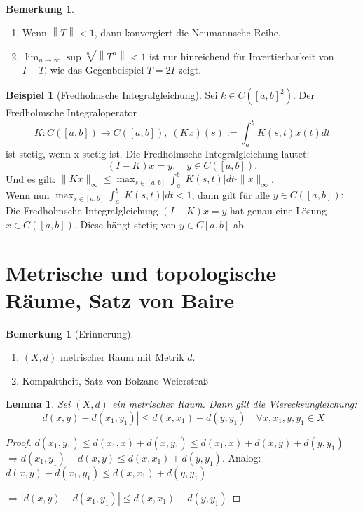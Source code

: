 \documentclass[ngerman]{report}
\theoremstyle{plain}%
\newtheorem{lemma}[thm]{Lemma}
\theoremstyle{definition}%
\newtheorem{bsp}[thm]{Beispiel}
\theoremstyle{myStyle}
\newtheorem{bem}[thm]{Bemerkung}
\newcommand{\norm}[1]{\left \|#1\right\| }
\newcommand{\df}[1][]{%
	\overset{#1}{\Rightarrow}
}
\newcommand{\limes}[1][\infty]{\lim_{n \to #1}}
\newcommand{\disp}{\displaystyle}
\begin{document}
	\begin{bem}
		\begin{enumerate}
			\item Wenn $\norm{T} < 1$, dann konvergiert die Neumannsche Reihe.
			\item $\disp \limes\sup\sqrt[n]{\norm{T^n}} <1$ ist nur hinreichend für Invertierbarkeit von $I-T$, wie das Gegenbeispiel $T = 2I$ zeigt.
		\end{enumerate}
	\end{bem}
	\begin{bsp}[Fredholmsche Integralgleichung]
		Sei $k\in C([a,b]^2)$.
		Der Fredholmsche Integraloperator $$K:C([a,b])\to C([a,b]),\; (Kx)(s):=\int^b_a K(s,t)x(t)dt$$ ist stetig, wenn x stetig ist.
		Die Fredholmsche Integralgleichung lautet: $$(I-K)x=y,\quad y\in C([a,b]).$$
		Und es gilt: $\displaystyle \|Kx\|_\infty \leq \max_{s\in[a,b]} \int^b_a |K(s,t)|dt\cdot\|x\|_\infty$.\\
		Wenn nun $\displaystyle \max_{s\in[a,b]} \int^b_a |K(s,t)|dt<1$, dann gilt für alle $ y\in C([a,b]):$
		Die Fredholmsche Integralgleichung $(I-K)x=y$ hat genau eine Lösung $x\in C([a,b])$. Diese hängt stetig von $y\in C[a,b]$ ab.
	\end{bsp}

\section{Metrische und topologische Räume, Satz von Baire}
	\begin{bem}[Erinnerung]
		\begin{enumerate}[-]
			\item $(X,d)$ metrischer Raum mit Metrik $d$.
			
			\item Kompaktheit, Satz von Bolzano-Weierstraß
		\end{enumerate}
	\end{bem}

	\begin{lemma}
		Sei $(X,d)$ ein metrischer Raum. Dann gilt die Vierecksungleichung:
		$$|d(x,y)-d(x_1,y_1)| \leq d(x,x_1) +d(y,y_1)\quad \forall x,x_1,y,y_1\in X$$
	\end{lemma}
	\begin{proof}
		$d(x_1,y_1) \leq d(x_1,x)+d(x,y_1) \leq d(x_1,x)+d(x,y)+d(y,y_1)$\\$\df d(x_1,y_1)-		d(x,y) \leq d(x,x_1)+d(y,y_1)$. Analog: $d(x,y)-d(x_1,y_1) \leq d(x,x_1)+d(y,y_1)$\par
		$\df |d(x,y) - d(x_1,y_1)| \leq d(x,x_1) +d(y,y_1)$
	\end{proof}
\end{document}
